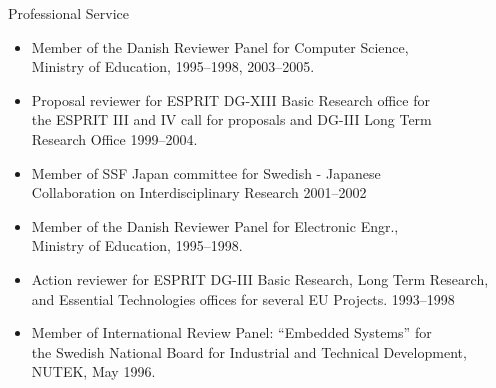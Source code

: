 \documentclass{article}
\begin{document}
\begin{cv}
\begin{cvlist}{Professional Service}
\begin{itemize}
 \item Member of the Danish Reviewer Panel for Computer Science,\\
   Ministry of Education, \cftdotfill{\cftdotsep}  1995--1998, 2003--2005.
 \item Proposal reviewer for ESPRIT DG-XIII Basic Research office for\\
   the ESPRIT III and IV call for proposals and DG-III Long Term\\
   Research Office \cftdotfill{\cftdotsep}  1999--2004.
 \item Member of SSF Japan committee for Swedish - Japanese\\
   Collaboration on Interdisciplinary Research \cftdotfill{\cftdotsep}
   2001--2002
 \item Member of the Danish Reviewer Panel for Electronic Engr.,\\
   Ministry of Education, \cftdotfill{\cftdotsep}  1995--1998.
 \item Action reviewer for ESPRIT DG-III Basic Research, Long Term
   Research,\\ and Essential Technologies offices for several EU
   Projects. \cftdotfill{\cftdotsep} 1993--1998
 \item Member of International Review Panel: ``Embedded Systems'' for\\
   the Swedish National Board for Industrial and Technical Development,\\
   NUTEK, \cftdotfill{\cftdotsep} May 1996.
 \end{itemize}
\end{cvlist}


\end{cv}
\end{document}
